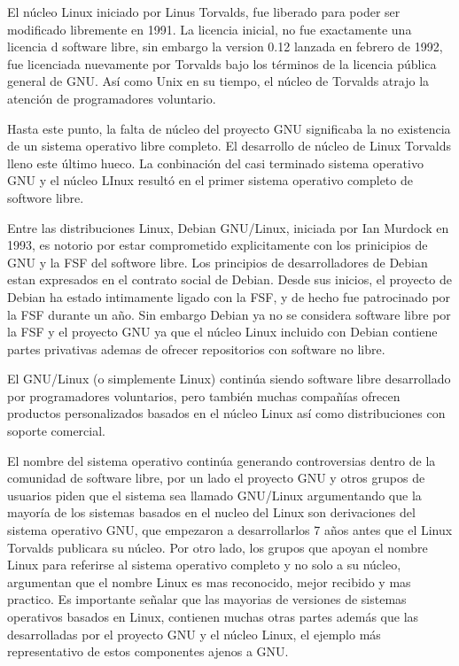 	El núcleo Linux iniciado por Linus Torvalds, fue liberado para poder ser modificado libremente en 1991. La licencia inicial, no fue exactamente una
	licencia d software libre, sin embargo la version 0.12 lanzada en febrero de 1992, fue licenciada nuevamente por Torvalds bajo los términos de la
	licencia pública general de GNU. Así como Unix en su tiempo, el núcleo de Torvalds atrajo la atención de programadores voluntario.

	Hasta este punto, la falta de núcleo del proyecto GNU significaba la no existencia de un sistema operativo libre completo. El desarrollo de núcleo de
	Linux Torvalds lleno este último hueco. La conbinación del casi terminado sistema operativo GNU y el núcleo LInux resultó en el primer sistema
	operativo completo de softwore libre.

	Entre las distribuciones Linux, Debian GNU/Linux, iniciada por Ian Murdock en 1993, es notorio por estar comprometido explicitamente con los
	prinicipios de GNU y la FSF del softwore libre. Los principios de desarrolladores de Debian estan expresados en el contrato social de Debian. Desde
	sus inicios, el proyecto de Debian ha estado intimamente ligado con la FSF, y de hecho fue patrocinado por la FSF durante un año. Sin embargo Debian
	ya no se considera software libre por la FSF y el proyecto GNU ya que el núcleo Linux incluido con Debian contiene partes privativas ademas de
	ofrecer repositorios con software no libre.

	El GNU/Linux (o simplemente Linux) continúa siendo software libre desarrollado por programadores voluntarios, pero también muchas compañías ofrecen
	productos personalizados basados en el núcleo Linux así como distribuciones con soporte comercial.

	El nombre del sistema operativo continúa generando controversias dentro de la comunidad de software libre, por un lado el proyecto GNU y otros grupos
	de usuarios piden que el sistema sea llamado GNU/Linux argumentando que la mayoría de los sistemas basados en el nucleo del Linux son derivaciones
	del sistema operativo GNU, que empezaron a desarrollarlos 7 años antes que el Linux Torvalds publicara su núcleo. Por otro lado, los grupos que
	apoyan el nombre Linux para referirse al sistema operativo completo y no solo a su núcleo, argumentan que el nombre Linux es mas reconocido, mejor
	recibido y mas practico.
 	Es importante señalar que las mayorias de versiones de sistemas operativos basados en Linux, contienen muchas otras partes además que las
 	desarrolladas por el proyecto GNU y el núcleo Linux, el ejemplo más representativo de estos componentes ajenos a GNU.

